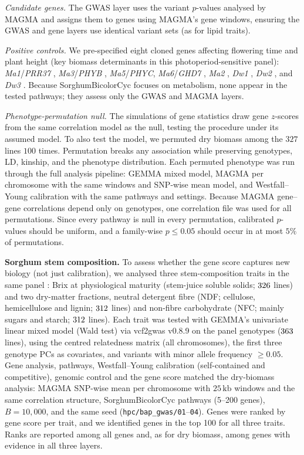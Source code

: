 \emph{Candidate genes.} The GWAS layer uses the variant $p$-values analysed by MAGMA and assigns them to genes using MAGMA’s gene windows, ensuring the GWAS and gene layers use identical variant sets (as for lipid traits).

\emph{Positive controls.} We pre-specified eight cloned genes affecting flowering time and plant height (key biomass determinants in this photoperiod-sensitive panel): \textit{Ma1}/\textit{PRR37} \citep{Murphy2011PRR37}, \textit{Ma3}/\textit{PHYB} \citep{Childs1997PHYB}, \textit{Ma5}/\textit{PHYC}, %
\textit{Ma6}/\textit{GHD7} \citep{Murphy2014Ghd7}, \textit{Ma2} \citep{Casto2019Ma2}, \textit{Dw1} \citep{Hilley2016Dw1}, \textit{Dw2} \citep{Hilley2017Dw2}, and \textit{Dw3} \citep{Multani2003Dw3}. Because SorghumBicolorCyc focuses on metabolism, none appear in the tested pathways; they assess only the GWAS and MAGMA layers.

\emph{Phenotype-permutation null.} The simulations of gene statistics draw gene $z$-scores from the same correlation model as the null, testing the procedure under its assumed model. To also test the model, we permuted dry biomass among the $327$ lines $100$ times. Permutation breaks any association while preserving genotypes, LD, kinship, and the phenotype distribution. Each permuted phenotype was run through the full analysis pipeline: GEMMA mixed model, MAGMA per chromosome with the same windows and SNP-wise mean model, and Westfall--Young calibration with the same pathways and settings. Because MAGMA gene--gene correlations depend only on genotypes, one correlation file was used for all permutations. Since every pathway is null in every permutation, calibrated $p$-values should be uniform, and a family-wise $p \le 0.05$ should occur in at most $5\%$ of permutations.

\textbf{Sorghum stem composition.} To assess whether the gene score captures new biology (not just calibration), we analysed three stem-composition traits in the same panel \citep{Brenton2016}: Brix at physiological maturity (stem-juice soluble solids; $326$ lines) and two dry-matter fractions, neutral detergent fibre (NDF; cellulose, hemicellulose and lignin; $312$ lines) and non-fibre carbohydrate (NFC; mainly sugars and starch; $312$ lines). Each trait was tested with GEMMA’s univariate linear mixed model \citep{Zhou2012GEMMA} (Wald test) via vcf2gwas v0.8.9 \citep{Vogt2022vcf2gwas} on the panel genotypes ($363$ lines), using the centred relatedness matrix (all chromosomes), the first three genotype PCs as covariates, and variants with minor allele frequency $\ge0.05$. Gene analysis, pathways, Westfall--Young calibration (self-contained and competitive), genomic control and the gene score matched the dry-biomass analysis: MAGMA SNP-wise mean per chromosome with $25\,\mathrm{kb}$ windows and the same correlation structure, SorghumBicolorCyc pathways (5--200 genes), $B=10{,}000$, and the same seed (\texttt{hpc/bap\_gwas/01}--\texttt{04}). Genes were ranked by gene score per trait, and we identified genes in the top 100 for all three traits. Ranks are reported among all genes and, as for dry biomass, among genes with evidence in all three layers.

